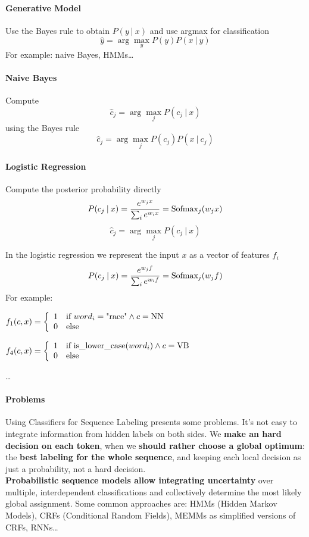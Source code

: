 \documentclass[10pt]{report}
\begin{document}
\paragraph{Generative Model} Use the Bayes rule to obtain $P(y\:|\:x)$ and use argmax for classification
$$\hat{y} = \arg\max_y P(y)P(x\:|\:y)$$
For example: naive Bayes, HMMs\ldots
\begin{multicols}{2}
\paragraph{Naive Bayes} Compute $$\hat{c}_j=\arg\max_j P(c_j\:|\:x)$$ using the Bayes rule $$\hat{c}_j = \arg\max_j P(c_j)P(x\:|\:c_j)$$
\columnbreak
\paragraph{Logistic Regression} Compute the posterior probability directly
$$P(c_j\:|\:x) = \frac{e^{w_jx}}{\sum_ie^{w_ix}}=\hbox{Sofmax}_j(w_jx)$$
$$\hat{c}_j = \arg\max_j P(c_j\:|\:x)$$
\end{multicols}
In the logistic regression we represent the input $x$ as a vector of features $f_i$
$$P(c_j\:|\:x) = \frac{e^{w_jf}}{\sum_ie^{w_if}}=\hbox{Sofmax}_j(w_jf)$$
For example:\begin{list}{}{}
	\item $f_1(c,x)=\left\{\begin{array}{l l}
	1&\hbox{if }word_i=\hbox{"race"}\wedge c=\hbox{NN}\\
	0&\hbox{else}
	\end{array}\right.$
	\item $f_4(c,x)=\left\{\begin{array}{l l}
	1&\hbox{if is\_lower\_case(}word_i\hbox{)}\wedge c= \hbox{VB}\\
	0&\hbox{else}
	\end{array}\right.$
	\item \ldots
\end{list}
\paragraph{Problems} Using Classifiers for Sequence Labeling presents some problems. It's not easy to integrate information from hidden labels on both sides. We \textbf{make an hard decision on each token}, when we \textbf{should rather choose a global optimum}: the \textbf{best labeling for the whole sequence}, and keeping each local decision as just a probability, not a hard decision.\\
\textbf{Probabilistic sequence models allow integrating uncertainty} over multiple, interdependent classifications and collectively determine the most likely global assignment. Some common approaches are: HMMs (Hidden Markov Models), CRFs (Conditional Random Fields), MEMMs as simplified versions of CRFs, RNNs\ldots
\end{document}
